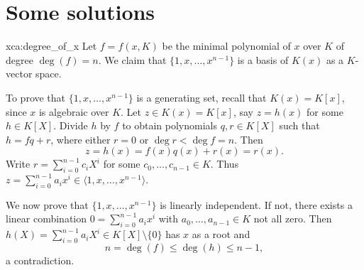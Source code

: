 \section*{Some solutions}



\begin{sol}{xca:degree_of_x}
    Let $f=f(x,K)$ be the minimal polynomial of $x$ over $K$ of degree $\deg(f)=n$.
    We claim that $\{1,x,\dots, x^{n-1}\}$ is a basis of $K(x)$ as a $K$-vector space. 

    To prove that $\{1,x,\dots, x^{n-1}\}$ is a generating set, recall that $K(x)=K[x]$, since $x$ is algebraic over $K$. 
    Let $z\in K(x)=K[x]$, say $z=h(x)$ for some $h\in K[X]$. 
    Divide $h$ by $f$ to obtain polynomials $q,r\in K[X]$ 
    such that $h=fq+r$, where either $r=0$ or $\deg r<\deg f=n$. Then 
    \[
		z=h(x)=f(x)q(x)+r(x)=r(x).
	\]
	Write $r=\sum_{i=0}^{n-1}c_iX^i$ for some $c_0,\dots,c_{n-1}\in K$. 
    Thus $z=\sum_{i=0}^{n-1}a_ix^i\in \langle 1,x,\dots,x^{n-1}\rangle$.
        
    We now prove that $\{1,x,\dots, x^{n-1}\}$ is linearly independent. If not, 
    there exists a linear combination
    $0=\sum_{i=0}^{n-1}a_ix^i$ with $a_0,\dots,a_{n-1}\in K$ not all zero. 
    Then $h(X)=\sum_{i=0}^{n-1}a_iX^i\in K[X]\setminus\{0\}$
    has $x$ as a root and 
        \[
        n=\deg(f)\leq \deg(h)\leq n-1,
        \]
       a contradiction. 
\end{sol}

